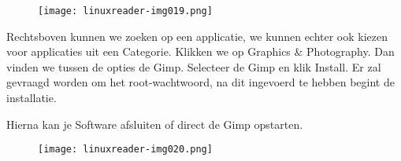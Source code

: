\begin{figure}[H]
\texttt{[image: linuxreader-img019.png]}
\end{figure}
{
Rechtsboven kunnen we zoeken op een applicatie, we kunnen echter ook kiezen voor applicaties uit een Categorie. Klikken
we op Graphics \& Photography. Dan vinden we tussen de opties de Gimp. Selecteer de Gimp en klik Install. Er zal
gevraagd worden om het root-wachtwoord, na dit ingevoerd te hebben begint de installatie.}

{
Hierna kan je Software afsluiten of direct de Gimp opstarten.}

\begin{figure}
\texttt{[image: linuxreader-img020.png]}
\end{figure}
